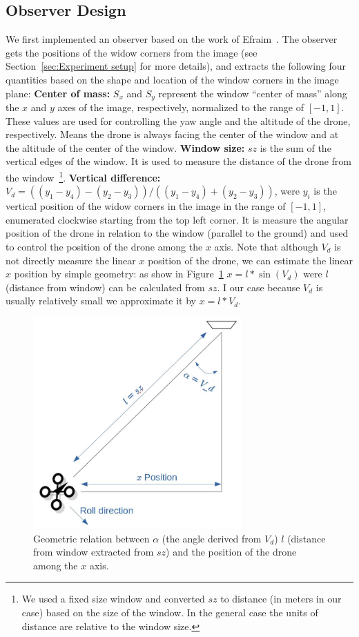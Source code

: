 \documentclass[ twoside, 12pt ]{article}
\begin{document}
\subsection{Observer Design}
\label{sec:Observer Design}
We first implemented an observer based on the work of Efraim~\cite{Efraim17}. The observer gets the positions of the widow corners from the image (see Section~\ref{sec:Experiment setup} for more details), %
and extracts the following four quantities based on the shape and location of the window corners in the image plane: %
\textbf{Center of mass:} $S_x$ and $S_y$ represent the window ``center of mass'' along the $x$ and $y$ axes of the image, respectively, normalized to the range of $[-1,1]$.
These values are used for controlling the yaw angle and the altitude of the drone, respectively. Means the drone is always facing the center of the window and at the altitude of the center of the window. 
\textbf{Window size:} $sz$ is the sum of the vertical edges of the window. It is used to measure the distance of the drone from the window~\footnote{We used a fixed size window and converted $sz$ to distance (in meters in our case) based on the size of the window. In the general case the units of distance are relative to the window size.}.
\textbf{Vertical difference:} $V_d = {((y_1-y_4)-(y_2-y_3))}/{((y_1-y_4)+(y_2-y_3))}$, were $y_i$ is the vertical position of the widow corners in the image in the range of $[-1,1]$, enumerated clockwise starting from the top left corner. It is measure the angular position of the drone in relation to the window (parallel to the ground) and used to control the position of the drone among the $x$ axis.
Note that although $V_d$ is not directly measure the linear $x$ position of the drone, we can estimate the linear $x$ position by simple geometry:
as show in Figure~\ref{fig:V_d-geomerty} $x = l * \sin (V_d)$ were $l$ (distance from window) can be calculated from $sz$. I our case because $V_d$ is usually relatively small we approximate it by $x = l * V_d$.

\begin{figure} %
    \centerline{\includegraphics[width=80mm]{vd-geometry.jpg}}
    \caption{Geometric relation between $\alpha$ (the angle derived from $V_d$) $l$ (distance from window extracted from $sz$) and the position of the drone among the $x$ axis.}
    \label{fig:V_d-geomerty}
\end{figure}
\end{document}
